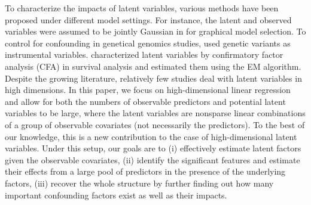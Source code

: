 \documentclass{statsoc}
\begin{document}





To characterize the impacts of latent variables, various methods have been proposed under different model settings. For instance, the latent and observed variables were assumed to be jointly Gaussian in \cite{Chandrasekaran2012} for graphical model selection. To control for confounding in genetical genomics studies, \cite{Lin2015} used genetic variants as instrumental variables. \cite{Pan2015} characterized latent variables by confirmatory factor analysis (CFA) in survival analysis and estimated them using the EM algorithm. Despite the growing literature, relatively few studies deal with latent variables in high dimensions. In this paper, we focus on high-dimensional linear regression and allow for both the numbers of observable predictors and potential latent variables to be large, where the latent variables are nonsparse linear combinations of a group of observable covariates (not necessarily the predictors). To the best of our knowledge, this is a new contribution to the case of high-dimensional latent variables. Under this setup, our goals are to (i) effectively estimate latent factors given the observable covariates, (ii) identify the significant features and estimate their effects from a large pool of predictors in the presence of the underlying factors, (iii) recover the whole structure by further finding out how many important confounding factors exist as well as their impacts.
\end{document}
